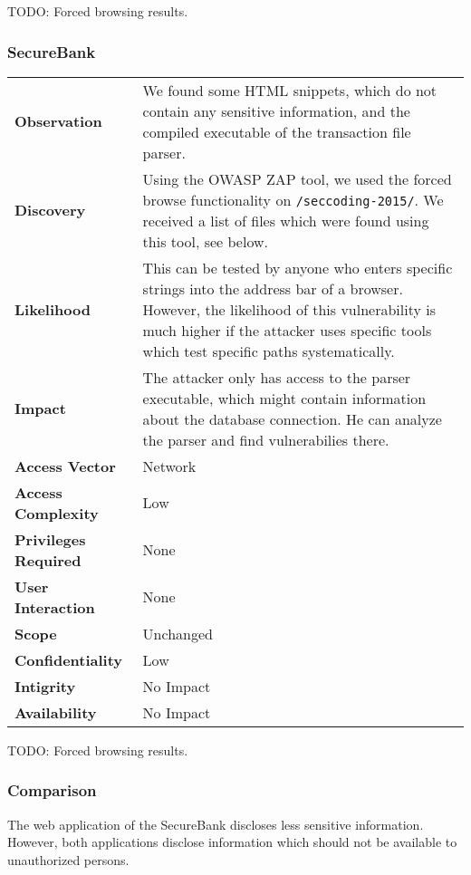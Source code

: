 TODO: Forced browsing results.

\subsubsection*{SecureBank}

\begin{tabular}{l|p{10cm}}

\textbf{Observation} & We found some HTML snippets, which do not contain any sensitive information, and the compiled executable of the transaction file parser. \\
\textbf{Discovery} & Using the OWASP ZAP tool, we used the forced browse functionality on \texttt{/seccoding-2015/}. We received a list of files which were found using this tool, see below. \\
\textbf{Likelihood} & This can be tested by anyone who enters specific strings into the address bar of a browser. However, the likelihood of this vulnerability is much higher if the attacker uses specific tools which test specific paths systematically. \\
\textbf{Impact} & The attacker only has access to the parser executable, which might contain information about the database connection. He can analyze the parser and find vulnerabilies there. \\
\textbf{Access Vector} & Network \\
\textbf{Access Complexity} & Low \\
\textbf{Privileges Required} & None \\
\textbf{User Interaction} & None \\
\textbf{Scope} & Unchanged \\
\textbf{Confidentiality} & Low \\
\textbf{Intigrity} & No Impact \\
\textbf{Availability} & No Impact \\
\end{tabular}

TODO: Forced browsing results.

\subsubsection*{Comparison}
The web application of the SecureBank discloses less sensitive information. However, both applications disclose information which should not be available to unauthorized persons.

\clearpage

